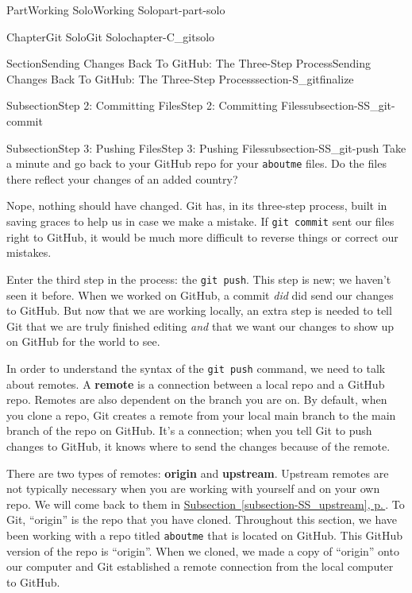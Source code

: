 \documentclass[twoside,10pt,]{book}
\newcommand{\xreffont}{\relax}
\newcommand{\mono}[1]{\texttt{#1}}
\newcommand{\terminology}[1]{\textbf{#1}}
\begin{document}
\begin{partptx}{Part}{Working Solo}{}{Working Solo}{}{}{part-part-solo}
\begin{chapterptx}{Chapter}{Git Solo}{}{Git Solo}{}{}{chapter-C_gitsolo}
\begin{sectionptx}{Section}{Sending Changes Back To GitHub: The Three-Step Process}{}{Sending Changes Back To GitHub: The Three-Step Process}{}{}{section-S_gitfinalize}
\begin{subsectionptx}{Subsection}{Step 2: Committing Files}{}{Step 2: Committing Files}{}{}{subsection-SS_git-commit}
\begin{enumerate}
\end{enumerate}
%
\end{subsectionptx}
%
%
\typeout{************************************************}
\typeout{************************************************}
%
\begin{subsectionptx}{Subsection}{Step 3: Pushing Files}{}{Step 3: Pushing Files}{}{}{subsection-SS_git-push}
%
%
%
%
%
%
Take a minute and go back to your GitHub repo for your \mono{aboutme} files. Do the files there reflect your changes of an added country?%
\par
Nope, nothing should have changed. Git has, in its three-step process, built in saving graces to help us in case we make a mistake. If \mono{git commit} sent our files right to GitHub, it would be much more difficult to reverse things or correct our mistakes.%
\par
Enter the third step in the process: the \mono{git push}. This step is new; we haven't seen it before. When we worked on GitHub, a commit \emph{did} did send our changes to GitHub. But now that we are working locally, an extra step is needed to tell Git that we are truly finished editing \emph{and} that we want our changes to show up on GitHub for the world to see.%
\par
In order to understand the syntax of the \mono{git push} command, we need to talk about remotes. A \terminology{remote} is a connection between a local repo and a GitHub repo. Remotes are also dependent on the branch you are on. By default, when you clone a repo, Git creates a remote from your local main branch to the main branch of the repo on GitHub. It's a connection; when you tell Git to push changes to GitHub, it knows where to send the changes because of the remote.%
\par
There are two types of remotes: \terminology{origin} and \terminology{upstream}. Upstream remotes are not typically necessary when you are working with yourself and on your own repo. We will come back to them in \hyperref[subsection-SS_upstream]{Subsection~{\xreffont\ref{subsection-SS_upstream}}, p.\,\pageref{subsection-SS_upstream}}. To Git, ``origin'' is the repo that you have cloned. Throughout this section, we have been working with a repo titled \mono{aboutme} that is located on GitHub. This GitHub version of the repo is ``origin''. When we cloned, we made a copy of ``origin'' onto our computer and Git established a remote connection from the local computer to GitHub.%

\end{subsectionptx}
\end{sectionptx}
\end{chapterptx}
\end{partptx}
\end{document}
